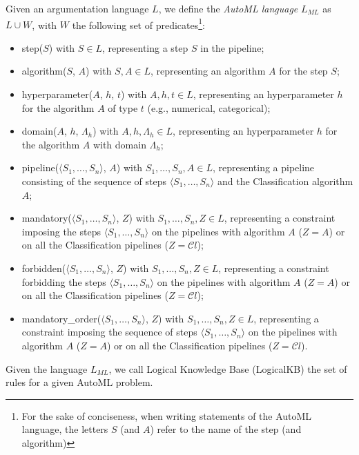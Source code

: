 \begin{definition}
Given an argumentation language $L$, we define the \emph{AutoML language} $L_{ML}$ as $L \cup W$, with $W$ the following set of predicates\footnote{For the sake of conciseness, when writing statements of the AutoML language, the letters $S$ (and $A$) refer to the name of the step (and algorithm)}:
\begin{itemize}
    \item step($S$) with $S \in L$, representing a step $S$ in the pipeline;
    \item algorithm($S$, $A$) with $S, A \in L$, representing an algorithm $A$ for the step $S$;
    \item hyperparameter($A$, $h$, $t$) with $A, h, t \in L$, representing an hyperparameter $h$ for the algorithm $A$ of type $t$ (e.g., numerical, categorical);
    \item domain($A$, $h$, $\Lambda_h$) with $A, h, \Lambda_h \in L$, representing an hyperparameter $h$ for the algorithm $A$ with domain $\Lambda_h$;
    \item pipeline($\langle S_1, \ldots, S_n \rangle$, $A$) with $S_1, \ldots, S_n, A \in L$, representing a pipeline consisting of the sequence of steps $\langle S_1, \ldots, S_n \rangle$ and the Classification algorithm $A$;
    \item mandatory($\langle S_1, \ldots, S_n \rangle$, $Z$) with $S_1, \ldots, S_n, Z \in L$, representing a constraint imposing the steps $\langle S_1, \ldots, S_n \rangle$ on the pipelines with algorithm $A$ ($Z = A$) or on all the Classification pipelines ($Z = \mathcal{C}l$);
    \item forbidden($\langle S_1, \ldots, S_n \rangle$, $Z$) with $S_1, \ldots, S_n, Z \in L$, representing a constraint forbidding the steps $\langle S_1, \ldots, S_n \rangle$ on the pipelines with algorithm $A$ ($Z = A$) or on all the Classification pipelines ($Z = \mathcal{C}l$);
    \item mandatory\_order($\langle S_1, \ldots, S_n \rangle$, $Z$) with $S_1, \ldots, S_n, Z \in L$, representing a constraint imposing the sequence of steps $\langle S_1, \ldots, S_n \rangle$ on the pipelines with algorithm $A$ ($Z = A$) or on all the Classification pipelines ($Z = \mathcal{C}l$).
\end{itemize}
\end{definition}

\begin{definition}
Given the language $L_{ML}$, we call Logical Knowledge Base (LogicalKB) the set of rules for a given AutoML problem.
\end{definition}


